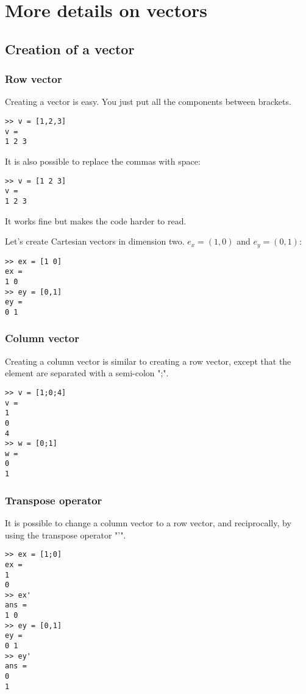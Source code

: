\section{More details on vectors}
\subsection{Creation of a vector}
\subsubsection{Row vector}
Creating a vector  is easy. You just put all the components between brackets.
\begin{lstlisting}
>> v = [1,2,3]
v =
1 2 3
\end{lstlisting}
It is also possible to replace the commas with space:
\begin{lstlisting}
>> v = [1 2 3]
v =
1 2 3
\end{lstlisting}

It works fine but makes the code harder to read.

Let's create Cartesian vectors in dimension two. $e_x = (1,0)$ and $e_y = (0,1)$:


\begin{lstlisting}
>> ex = [1 0]
ex =
1 0
>> ey = [0,1]
ey =
0 1
\end{lstlisting}
 


\subsubsection{Column vector}
Creating a column vector is similar to creating a row vector, except that the element are separated with a semi-colon ";".


\begin{lstlisting}
>> v = [1;0;4]
v =
1
0
4
>> w = [0;1]
w =
0
1
\end{lstlisting}

\subsubsection{Transpose operator}
It is possible to change a column vector to a row vector, and reciprocally, by using the transpose operator "'".
\begin{lstlisting}
>> ex = [1;0]
ex =
1
0
>> ex'
ans =
1 0
>> ey = [0,1]
ey =
0 1
>> ey'
ans =
0
1
\end{lstlisting}


